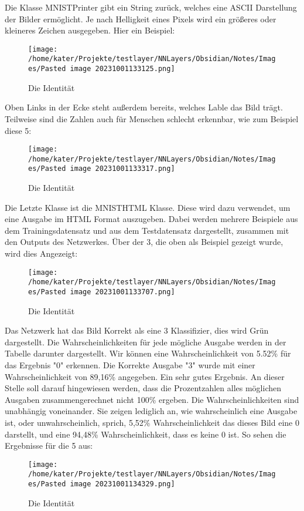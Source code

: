 \documentclass[12pt]{article}
\begin{document}
Die Klasse MNISTPrinter gibt ein String zurück, welches eine ASCII Darstellung der Bilder ermöglicht. Je nach Helligkeit eines Pixels wird ein größeres oder kleineres Zeichen ausgegeben. Hier ein Beispiel:\begin{figure}[H]
\centering
\texttt{[image: /home/kater/Projekte/testlayer/NNLayers/Obsidian/Notes/Images/Pasted image 20231001133125.png]}
\caption{Die Identität}
\label{Was kommt hier rein?}\end{figure}Oben Links in der Ecke steht außerdem bereits, welches Lable das Bild trägt. Teilweise sind die Zahlen auch für Menschen schlecht erkennbar, wie zum Beispiel diese 5:\begin{figure}[H]
\centering
\texttt{[image: /home/kater/Projekte/testlayer/NNLayers/Obsidian/Notes/Images/Pasted image 20231001133317.png]}
\caption{Die Identität}
\label{Was kommt hier rein?}\end{figure}Die Letzte Klasse ist die MNISTHTML Klasse. Diese wird dazu verwendet, um eine Ausgabe im HTML Format auszugeben. Dabei werden mehrere Beispiele aus dem Trainingsdatensatz und aus dem Testdatensatz dargestellt, zusammen mit den Outputs des Netzwerkes.
Über der 3, die oben als Beispiel gezeigt wurde, wird dies Angezeigt:\begin{figure}[H]
\centering
\texttt{[image: /home/kater/Projekte/testlayer/NNLayers/Obsidian/Notes/Images/Pasted image 20231001133707.png]}
\caption{Die Identität}
\label{Was kommt hier rein?}\end{figure}Das Netzwerk hat das Bild Korrekt als eine 3 Klassifizier, dies wird Grün dargestellt. Die Wahrscheinlichkeiten für jede mögliche Ausgabe werden in der Tabelle darunter dargestellt. Wir können eine Wahrscheinlichkeit von 5.52\% für das Ergebnis "0" erkennen. Die Korrekte Ausgabe "3" wurde mit einer Wahrscheinlichkeit von 89,16\% angegeben. Ein sehr gutes Ergebnis. An dieser Stelle soll darauf hingewiesen werden, dass die Prozentzahlen alles möglichen Ausgaben zusammengerechnet nicht 100\% ergeben. Die Wahrscheinlichkeiten sind unabhängig voneinander. Sie zeigen lediglich an, wie wahrscheinlich eine Ausgabe ist, oder unwahrscheinlich, sprich, 5,52\% Wahrscheinlichkeit das dieses Bild eine 0 darstellt, und eine 94,48\% Wahrscheinlichkeit, dass es keine 0 ist.
So sehen die Ergebnisse für die 5 aus:\begin{figure}[H]
\centering
\texttt{[image: /home/kater/Projekte/testlayer/NNLayers/Obsidian/Notes/Images/Pasted image 20231001134329.png]}
\caption{Die Identität}
\label{Was kommt hier rein?}
\end{figure}
\end{document}
